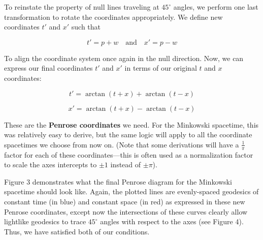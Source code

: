 \documentclass{article}
\begin{document}
To reinstate the property of null lines traveling at $45^{\circ}$ angles, we perform one last transformation to rotate the coordinates appropriately. We define new coordinates $t'$ and $x'$ such that

\begin{equation}
    t' = p + w
    \quad \text{and}\quad
    x' = p - w
\end{equation}

To align the coordinate system once again in the null direction. Now, we can express our final coordinates $t'$ and $x'$ in terms of our original $t$ and $x$ coordinates:

\begin{equation}
    t' = \arctan(t+x) + \arctan(t-x) 
\end{equation}

\begin{equation}
    x' = \arctan(t+x) - \arctan(t-x) 
\end{equation}

These are the \textbf{Penrose coordinates} we need. For the Minkowski spacetime, this was relatively easy to derive, but the same logic will apply to all the coordinate spacetimes we choose from now on. (Note that some derivations will have a $\frac{1}{\pi}$ factor for each of these coordinates---this is often used as a normalization factor to scale the axes intercepts to $\pm1$ instead of $\pm \pi$).

Figure 3 demonstrates what the final Penrose diagram for the Minkowski spacetime should look like. Again, the plotted lines are evenly-spaced geodesics of constant time (in blue) and constant space (in red) as expressed in these new Penrose coordinates, except now the intersections of these curves clearly allow lightlike geodesics to trace $45^{\circ}$ angles with respect to the axes (see Figure 4). Thus, we have satisfied both of our conditions.
\end{document}

